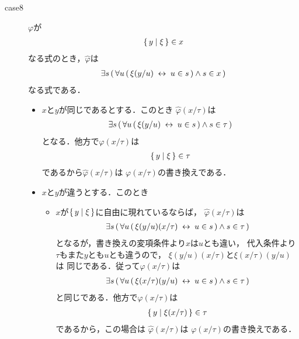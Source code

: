 \begin{metaprf}[第一]
\begin{description}
\begin{description}
					\item[case8] $\varphi$が
						\begin{align}
							\{\, y \mid \xi\, \} \in x
						\end{align}
						なる式のとき，$\widehat{\varphi}$は
						\begin{align}
							\exists s\, (\, \forall u\, (\, \xi(y/u) \hspace{0.25em}\leftrightarrow\hspace{0.25em} u \in s\, ) \wedge s \in x\, )
						\end{align}
						なる式である．
						\begin{itemize}
							\item $x$と$y$が同じであるとする．このとき
								$\widehat{\varphi}(x/\tau)$は
								\begin{align}
									\exists s\, (\, \forall u\, (\, \xi(y/u) \hspace{0.25em}\leftrightarrow\hspace{0.25em} u \in s\, ) \wedge s \in \tau\, )
								\end{align}
								となる．他方で$\varphi(x/\tau)$は
								\begin{align}
									\{\, y \mid \xi\, \} \in \tau
								\end{align}
								であるから$\widehat{\varphi}(x/\tau)$は
								$\varphi(x/\tau)$の書き換えである．
								
							\item $x$と$y$が違うとする．このとき
								\begin{itemize}
									\item $x$が$\{\, y \mid \xi\, \}$に自由に現れているならば，
										$\widehat{\varphi}(x/\tau)$は
										\begin{align}
											\exists s\, (\, \forall u\, (\, \xi(y/u)(x/\tau) \hspace{0.25em}\leftrightarrow\hspace{0.25em} u \in s\, ) \wedge s \in \tau\, )
										\end{align}
										となるが，書き換えの変項条件より$x$は$u$とも違い，
										代入条件より$\tau$もまた$y$とも$u$とも違うので，
										$\xi(y/u)(x/\tau)$と$\xi(x/\tau)(y/u)$は
										同じである．従って$\widehat{\varphi}(x/\tau)$は
										\begin{align}
											\exists s\, (\, \forall u\, (\, \xi(x/\tau)(y/u) \hspace{0.25em}\leftrightarrow\hspace{0.25em} u \in s\, ) \wedge s \in \tau\, )
										\end{align}
										と同じである．他方で$\varphi(x/\tau)$は
										\begin{align}
											\{\, y \mid \xi(x/\tau)\, \} \in \tau
										\end{align}
										であるから，この場合は
										$\widehat{\varphi}(x/\tau)$は
										$\varphi(x/\tau)$の書き換えである．
										

\end{itemize}
\end{itemize}
\end{description}
\end{description}
\end{metaprf}
